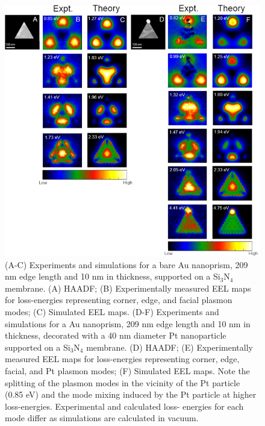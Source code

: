 \documentclass [11pt, proquest] {uwthesis}[2016/11/22]
\begin{document}
\begin{figure}
\begin{centering}
\includegraphics{prisms_mode_maps_tip.png}
\caption{(A-C) Experiments and simulations for a bare Au nanoprism, 209 nm edge length and 10 nm in thickness, supported on a Si$_3$N$_4$ membrane. (A) HAADF; (B) Experimentally measured EEL maps for loss-energies representing corner, edge, and facial plasmon modes; (C) Simulated EEL maps. (D-F) Experiments and simulations for a Au nanoprism, 209 nm edge length and 10 nm in thickness, decorated with a 40 nm diameter Pt nanoparticle supported on a Si$_3$N$_4$ membrane. (D) HAADF; (E) Experimentally measured EEL maps for loss-energies representing corner, edge, facial, and Pt plasmon modes; (F) Simulated EEL maps. Note the splitting of the plasmon modes in the vicinity of the Pt particle (0.85 eV) and the mode mixing induced by the Pt particle at higher loss-energies. Experimental and calculated loss- energies for each mode differ as simulations are calculated in vacuum.}
\label{modes_tip}
\end{centering}
\end{figure}
\end{document}
